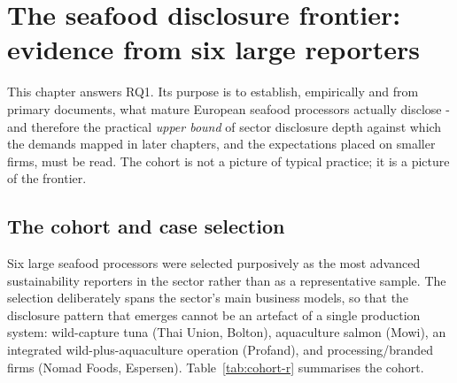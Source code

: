 \documentclass[
]{article}
\begin{document}

\fi %

\setcounter{table}{0}
\setcounter{figure}{1}


\FloatBarrier

\FloatBarrier

\FloatBarrier

\iffalse %
\section{The seafood disclosure frontier: evidence from six large
reporters}\label{cohort-analysis}

This chapter answers RQ1. Its purpose is to establish, empirically and
from primary documents, what mature European seafood processors actually
disclose - and therefore the practical \emph{upper bound} of sector
disclosure depth against which the demands mapped in later chapters, and
the expectations placed on smaller firms, must be read. The cohort is not
a picture of typical practice; it is a picture of the frontier.

\subsection{The cohort and case selection}\label{cohort-selection}

Six large seafood processors were selected purposively as the most
advanced sustainability reporters in the sector rather than as a
representative sample. The selection deliberately spans the sector's main
business models, so that the disclosure pattern that emerges cannot be an
artefact of a single production system: wild-capture tuna (Thai Union,
Bolton), aquaculture salmon (Mowi), an integrated wild-plus-aquaculture
operation (Profand), and processing/branded firms (Nomad Foods,
Espersen). Table~\ref{tab:cohort-r} summarises the cohort.
\end{document}
